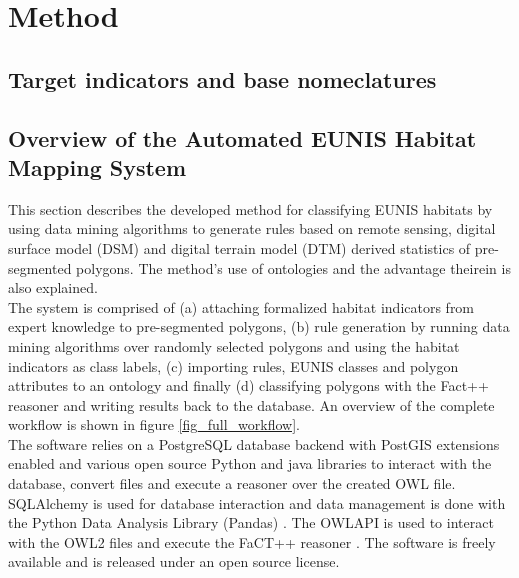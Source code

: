 \documentclass[authoryear, review,12pt,number]{elsarticle}
\begin{document}
  \section{Method} \subsection{Target indicators
and base nomeclatures} \label{subsec_indicators_and_nomenclatures}


\subsection{Overview of the Automated EUNIS Habitat Mapping System}
This section describes the developed method for classifying EUNIS habitats by
using data mining algorithms to generate rules based on remote sensing, digital
surface model (DSM) and digital terrain model (DTM) derived statistics of
pre-segmented polygons. The method's use of ontologies and the advantage
theirein is also explained.\\ The system is comprised of (a) attaching
formalized habitat indicators from expert knowledge to pre-segmented polygons,
(b) rule generation by running data mining algorithms over randomly selected
polygons and using the habitat indicators as class labels, (c) importing rules,
EUNIS classes and polygon attributes to an ontology and finally (d) classifying
polygons with the Fact++ reasoner \citep{Tsarkov2006} and writing results back
to the database. An overview of the complete workflow is shown in figure
\ref{fig_full_workflow}.\\
The software relies on a PostgreSQL database backend with PostGIS extensions
enabled and various open source Python and java libraries to interact with the
database, convert files and execute a reasoner over the created OWL file.
SQLAlchemy is used for database interaction and data management is done with
the Python Data Analysis Library (Pandas) \citep{McKinney2010}. The OWLAPI is
used to interact with the OWL2 files and execute the FaCT++ reasoner
\citep{Tsarkov2006}. The software is freely available and is released under an
open source license.  
\end{document}
